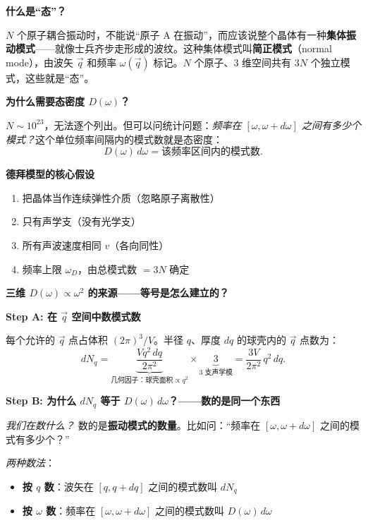 \begin{warnbox}
\textbf{什么是``态''？}

$N$ 个原子耦合振动时，不能说``原子 A 在振动''，而应该说整个晶体有一种\textbf{集体振动模式}——就像士兵齐步走形成的波纹。这种集体模式叫\textbf{简正模式}（normal mode），由波矢 $\vec q$ 和频率 $\omega(\vec q)$ 标记。$N$ 个原子、3 维空间共有 $3N$ 个独立模式，这些就是``态''。

\textbf{为什么需要态密度 $D(\omega)$？}

$N\sim10^{23}$，无法逐个列出。但可以问统计问题：\textit{频率在 $[\omega,\omega+d\omega]$ 之间有多少个模式？}这个单位频率间隔内的模式数就是态密度：
\[
D(\omega)\,d\omega = \text{该频率区间内的模式数}.
\]

\textbf{德拜模型的核心假设}
\begin{enumerate}
    \item 把晶体当作连续弹性介质（忽略原子离散性）
    \item 只有声学支（没有光学支）
    \item 所有声波速度相同 $v$（各向同性）
    \item 频率上限 $\omega_D$，由总模式数 $=3N$ 确定
\end{enumerate}

\textbf{三维 $D(\omega)\propto\omega^2$ 的来源——等号是怎么建立的？}

\textbf{Step A: 在 $\vec q$ 空间中数模式数}

每个允许的 $\vec q$ 点占体积 $(2\pi)^3/V$。半径 $q$、厚度 $dq$ 的球壳内的 $\vec q$ 点数为：
\begin{equation}
dN_q = \underbrace{\frac{Vq^2\,dq}{2\pi^2}}_{\text{几何因子：球壳面积}\propto q^2} \times \underbrace{3}_{\text{3 支声学模}} = \frac{3V}{2\pi^2}\,q^2\,dq.
\label{eq:q-space-dN}
\end{equation}

\textbf{Step B: 为什么 $dN_q$ 等于 $D(\omega)\,d\omega$？——数的是同一个东西}

\textit{我们在数什么？} 数的是\textbf{振动模式的数量}。比如问：``频率在 $[\omega,\omega+d\omega]$ 之间的模式有多少个？''

\textit{两种数法}：
\begin{itemize}
    \item \textbf{按 $q$ 数}：波矢在 $[q,q+dq]$ 之间的模式数叫 $dN_q$
    \item \textbf{按 $\omega$ 数}：频率在 $[\omega,\omega+d\omega]$ 之间的模式数叫 $D(\omega)\,d\omega$
\end{itemize}


\end{warnbox}
